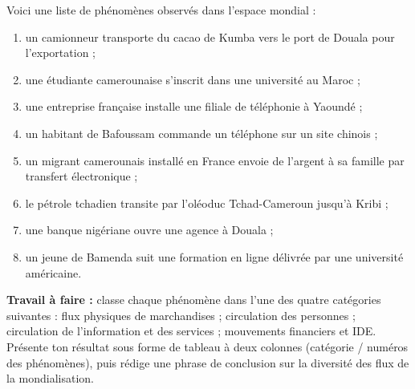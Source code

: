 \documentclass[11pt]{article}
\newcounter{popsec}
\newcounter{popsub}
\newcommand{\courssub}[1]{%
  \stepcounter{popsub}%
  \par\vspace{9pt}\noindent{\popxbold\fontsize{11.5}{13}\selectfont\color{popink}{\color{poporange}\thepopsec.\thepopsub}\hspace{6pt}#1}\par\nopagebreak\vspace{4pt}
}
\begin{document}
\courssub{Je m'entraîne}

\begin{exercice}
Voici une liste de phénomènes observés dans l'espace mondial :
\begin{enumerate}
\item un camionneur transporte du cacao de Kumba vers le port de Douala pour l'exportation ;
\item une étudiante camerounaise s'inscrit dans une université au Maroc ;
\item une entreprise française installe une filiale de téléphonie à Yaoundé ;
\item un habitant de Bafoussam commande un téléphone sur un site chinois ;
\item un migrant camerounais installé en France envoie de l'argent à sa famille par transfert électronique ;
\item le pétrole tchadien transite par l'oléoduc Tchad-Cameroun jusqu'à Kribi ;
\item une banque nigériane ouvre une agence à Douala ;
\item un jeune de Bamenda suit une formation en ligne délivrée par une université américaine.
\end{enumerate}
\textbf{Travail à faire :} classe chaque phénomène dans l'une des quatre catégories suivantes : flux physiques de marchandises ; circulation des personnes ; circulation de l'information et des services ; mouvements financiers et IDE. Présente ton résultat sous forme de tableau à deux colonnes (catégorie / numéros des phénomènes), puis rédige une phrase de conclusion sur la diversité des flux de la mondialisation.
\end{exercice}
\end{document}
